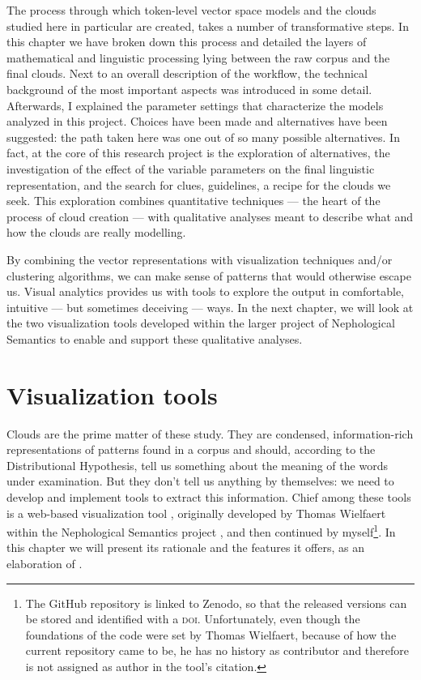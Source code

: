\documentclass[
]{book}
\begin{document}
The process through which token-level vector space models and the clouds studied here in particular are created, takes a number of transformative steps. In this chapter we have broken down this process and detailed the layers of mathematical and linguistic processing lying between the raw corpus and the final clouds. Next to an overall description of the workflow, the technical background of the most important aspects was introduced in some detail. Afterwards, I explained the parameter settings that characterize the models analyzed in this project.
Choices have been made and alternatives have been suggested: the path taken here was one out of so many possible alternatives. In fact, at the core of this research project is the exploration of alternatives, the investigation of the effect of the variable parameters on the final linguistic representation, and the search for clues, guidelines, a recipe for the clouds we seek. This exploration combines quantitative techniques --- the heart of the process of cloud creation --- with qualitative analyses meant to describe what and how the clouds are really modelling.

By combining the vector representations with visualization techniques and/or clustering algorithms, we can make sense of patterns that would otherwise escape us. Visual analytics provides us with tools to explore the output in comfortable, intuitive --- but sometimes deceiving --- ways. In the next chapter, we will look at the two visualization tools developed within the larger project of Nephological Semantics to enable and support these qualitative analyses.

\hypertarget{nephovis}{%
\chapter{Visualization tools}\label{nephovis}}

Clouds are the prime matter of these study. They are condensed, information-rich representations of patterns found in a corpus and should, according to the Distributional Hypothesis, tell us something about the meaning of the words under examination. But they don't tell us anything by themselves: we need to develop and implement tools to extract this information. Chief among these tools is a web-based visualization tool \autocite{montes.qlvl_2021a}, originally developed by Thomas Wielfaert within the Nephological Semantics project \autocite[see][]{wielfaert.etal_2019}, and then continued by myself\footnote{The GitHub repository is linked to Zenodo, so that the released versions can be stored and identified with a \textsc{doi}. Unfortunately, even though the foundations of the code were set by Thomas Wielfaert, because of how the current repository came to be, he has no history as contributor and therefore is not assigned as author in the tool's citation.}. In this chapter we will present its rationale and the features it offers, as an elaboration of \textcite{montes.heylen_Submitted}.
\end{document}
